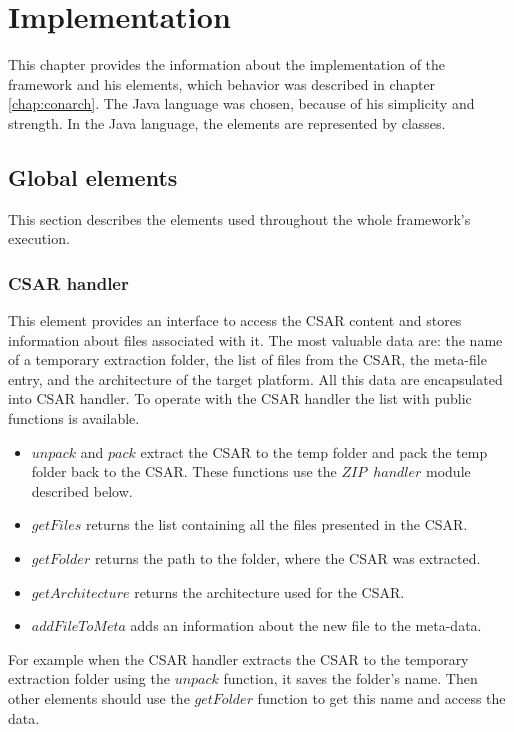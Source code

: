 
\chapter{Implementation}\label{chap:imp}
This chapter provides the information about the implementation of the framework and his elements, which behavior was described in chapter \ref{chap:conarch}.
The Java language was chosen, because of his simplicity and strength. 
In the Java language, the elements are represented by classes.

\section{Global elements}
This section describes the elements used throughout the whole framework's execution.

\subsection*{CSAR handler}
This element provides an interface to access the CSAR content and stores information about files associated with it.
The most valuable data are: the name of a temporary extraction folder, the list of files from the CSAR, the meta-file entry, and the architecture of the target platform.
All this data are encapsulated into CSAR handler.
To operate with the CSAR handler the list with public functions is available.
\begin{itemize}
	\item $unpack$ and $pack$ extract the CSAR to the temp folder and pack the temp folder back to the CSAR. 
	These functions use the $ZIP$~$handler$ module described below.
	\item $getFiles$ returns the list containing all the files presented in the CSAR.
	\item $getFolder$ returns the path to the folder, where the CSAR was extracted.
	\item $getArchitecture$ returns the architecture used for the CSAR.
	\item $addFileToMeta$ adds an information about the new file to the meta-data.
\end{itemize}
For example when the CSAR handler extracts the CSAR to the temporary extraction folder using the $unpack$ function, it saves the folder's name. 
Then other elements should use the $getFolder$ function to get this name and access the data.

